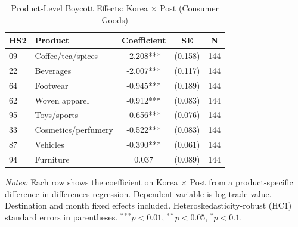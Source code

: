 \begin{table}[htbp]
\centering
\caption{Product-Level Boycott Effects: Korea $\times$ Post (Consumer Goods)}
\label{tab:products}
\begin{threeparttable}
\begin{tabular}{llccc}
\toprule
HS2 & Product & Coefficient & SE & N \\
\midrule
09 & Coffee/tea/spices & -2.208*** & (0.158) & 144 \\
22 & Beverages & -2.007*** & (0.117) & 144 \\
64 & Footwear & -0.945*** & (0.189) & 144 \\
62 & Woven apparel & -0.912*** & (0.083) & 144 \\
95 & Toys/sports & -0.656*** & (0.076) & 144 \\
33 & Cosmetics/perfumery & -0.522*** & (0.083) & 144 \\
87 & Vehicles & -0.390*** & (0.061) & 144 \\
94 & Furniture & 0.037 & (0.089) & 144 \\
\bottomrule
\end{tabular}
\begin{tablenotes}[flushleft]\footnotesize
\item \textit{Notes:} Each row shows the coefficient on Korea $\times$ Post from a product-specific difference-in-differences regression. Dependent variable is log trade value. Destination and month fixed effects included. Heteroskedasticity-robust (HC1) standard errors in parentheses. $^{***}p<0.01$, $^{**}p<0.05$, $^{*}p<0.1$.
\end{tablenotes}
\end{threeparttable}
\end{table}
